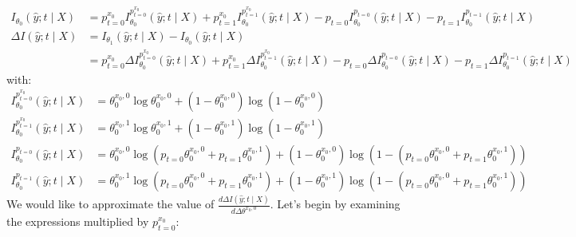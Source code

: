 \documentclass[oneside,12pt]{article}
\begin{document}
\begin{equation*}
    \begin{split}
        I_{\theta_0}(\hat{y};t \mid X) &=p^{x_0}_{t=0}I^{p^{x_0}_{t=0}}_{\theta_0}(\hat{y};t \mid X) + p^{x_0}_{t=1}I^{p^{x_0}_{t=1}}_{\theta_0}(\hat{y};t \mid X) - p_{t=0}I^{p_{t=0}}_{\theta_0}(\hat{y};t \mid X) - p_{t=1}I^{p_{t=1}}_{\theta_0}(\hat{y};t \mid X)\\
        \Delta I(\hat{y};t \mid X) &= I_{\theta_1}(\hat{y};t \mid X) - I_{\theta_0}(\hat{y};t \mid X)\\
        &= p^{x_0}_{t=0}\Delta I^{p^{x_0}_{t=0}}_{\theta_0}(\hat{y};t \mid X) + p^{x_0}_{t=1}\Delta I^{p^{x_0}_{t=1}}_{\theta_0}(\hat{y};t \mid X) - p_{t=0}\Delta I^{p_{t=0}}_{\theta_0}(\hat{y};t \mid X) - p_{t=1}\Delta I^{p_{t=1}}_{\theta_0}(\hat{y};t \mid X)
    \end{split}
\end{equation*} 
with:
\begin{equation*}
    \begin{split}
        I^{p^{x_0}_{t=0}}_{\theta_0}(\hat{y};t \mid X) &= \theta_0^{x_0,0}\operatorname{log}\theta_0^{x_0,0} + (1-\theta_0^{x_0,0})\operatorname{log}(1-\theta_0^{x_0,0})\\
        I^{p^{x_0}_{t=1}}_{\theta_0}(\hat{y};t \mid X) &= \theta_0^{x_0,1}\operatorname{log}\theta_0^{x_0,1} + (1-\theta_0^{x_0,1})\operatorname{log}(1-\theta_0^{x_0,1})\\
        I^{p_{t=0}}_{\theta_0}(\hat{y};t \mid X) &= \theta_0^{x_0,0}\operatorname{log}(p_{t=0}\theta_0^{x_0,0}+p_{t=1}\theta_0^{x_0,1})+
        (1-\theta_0^{x_0,0})\operatorname{log}(1 - (p_{t=0}\theta_0^{x_0,0}+p_{t=1}\theta_0^{x_0,1}))\\
        I^{p_{t=1}}_{\theta_0}(\hat{y};t \mid X) &= \theta_0^{x_0,1}\operatorname{log}(p_{t=0}\theta_0^{x_0,0}+p_{t=1}\theta_0^{x_0,1})+
        (1-\theta_0^{x_0,1})\operatorname{log}(1 - (p_{t=0}\theta_0^{x_0,0}+p_{t=1}\theta_0^{x_0,1}))
    \end{split}
\end{equation*}
%
We would like to approximate the value of $\frac{d\Delta I(\hat{y};t \mid X)}{d\Delta\theta^{x_0,0}}$. 
Let's begin by examining the expressions multiplied by $p^{x_0}_{t=0}$:
%
\end{document}

